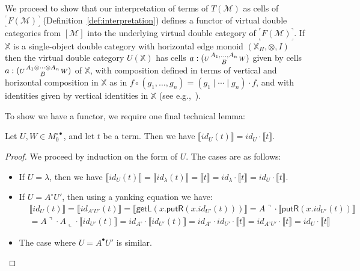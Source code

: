 \documentclass[twoside,11pt,final]{entics}
\newcommand{\X}{\mathbb{X}}
\newcommand{\getl}{\mathsf{getL}}
\newcommand{\putr}{\mathsf{putR}}
\newcommand{\corner}[1]{{\text{}^\ulcorner_\llcorner\!{#1}\!_\lrcorner^\urcorner}}
\newcommand{\ex}[1]{{#1}^{\circ\bullet}}
\newcommand{\cells}[4]{({\scriptstyle #1} {{\scriptstyle #2} \atop {\scriptstyle #3}} {\scriptstyle #4})}
\newcommand{\seq}{,\!\ldots\!,}
\begin{document}
We proceed to show that our interpretation of terms of $T(\mathcal{M})$ as cells of $\corner{F(\mathcal{M})}$ (Definition~\ref{def:interpretation}) defines a functor of virtual double categories from $[\mathcal{M}]$ into the underlying virtual double category of $\corner{F(\mathcal{M})}$. If $\X$ is a single-object double category with horizontal edge monoid $(\X_H,\otimes,I)$ then the virtual double category $U(\X)$ has cells $a : \cells{U}{A_1,\ldots,A_n}{B}{W}$ given by cells $a : \cells{U}{A_1 \otimes \cdots \otimes A_n}{B}{W}$ of $\X$, with composition defined in terms of vertical and horizontal composition in $\X$ as in $f \circ (g_1 \seq g_n) = (g_1 \mid \cdots \mid g_n) \cdot f$, and with identities given by vertical identities in $\X$ (see e.g.,~\cite{Leinster2004}). 

To show we have a functor, we require one final technical lemma:
\begin{lemma}\label{lem:id-property}
  Let $U,W \in \ex{M}_0$, and let $t$ be a term. Then we have $\llbracket id_U(t) \rrbracket = id_U \cdot \llbracket t \rrbracket$.
\end{lemma}
\begin{proof}
  We proceed by induction on the form of $U$. The cases are as follows:
  \begin{itemize}
  \item If $U = \lambda$, then we have $\llbracket id_U(t) \rrbracket = \llbracket id_\lambda(t) \rrbracket = \llbracket t \rrbracket = id_\lambda \cdot \llbracket t \rrbracket = id_U \cdot \llbracket t \rrbracket$.
  \item If $U = A^\circ U'$, then using a yanking equation we have:
    \begin{align*}
      & \llbracket id_U(t) \rrbracket
        = \llbracket id_{A^\circ U'}(t) \rrbracket
        = \llbracket \getl(x.\putr(x.id_{U'}(t))) \rrbracket
        = {A\urcorner} \cdot \llbracket \putr(x.id_{U'}(t)) \rrbracket
      \\&= {A\urcorner} \cdot {A\llcorner} \cdot \llbracket id_{U'}(t) \rrbracket
      = id_{A^\circ} \cdot \llbracket id_{U'}(t) \rrbracket
      = id_{A^\circ} \cdot id_{U'} \cdot \llbracket t \rrbracket
      = id_{A^\circ U'} \cdot \llbracket t \rrbracket
      = id_U \cdot \llbracket t \rrbracket
    \end{align*}
  \item The case where $U = A^\bullet U'$ is similar.
	\end{itemize}
\end{proof}
\end{document}
